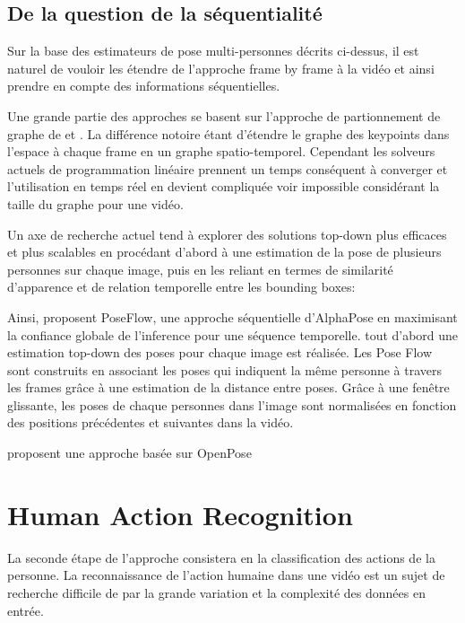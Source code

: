 \subsection{De la question de la séquentialité}
Sur la base des estimateurs de pose multi-personnes décrits ci-dessus, il est naturel de vouloir les étendre
de l'approche frame by frame à la vidéo et ainsi prendre en compte des informations séquentielles.

Une grande partie des approches se basent sur l'approche de partionnement de graphe de \cite{2015arXiv151106645P} et \cite{2016arXiv160503170I}. La différence notoire étant d'étendre le graphe des keypoints dans l'espace à chaque frame en un graphe spatio-temporel. Cependant les solveurs actuels de programmation linéaire prennent un temps conséquent à converger et l'utilisation en temps réel en devient compliquée voir impossible considérant la taille du graphe pour une vidéo.

Un axe de recherche actuel tend à explorer des solutions top-down plus efficaces et plus scalables en procédant d'abord à une estimation de la pose de plusieurs personnes sur chaque image, puis en les reliant
en termes de similarité d'apparence et de relation temporelle entre les bounding boxes:

Ainsi, \cite{2018arXiv180200977X} proposent PoseFlow, une approche séquentielle d'AlphaPose \cite{fang2017rmpe} en maximisant la confiance globale de l'inference pour une séquence temporelle. tout d'abord une estimation top-down des poses pour chaque image est réalisée. Les Pose Flow sont construits en associant les poses qui indiquent la même personne à travers les frames grâce à une estimation de la distance entre poses. Grâce à une fenêtre glissante, les poses de chaque personnes dans l'image sont normalisées en fonction des positions précédentes et suivantes dans la vidéo.

\cite{Raaj_2019_CVPR} proposent une approche basée sur OpenPose \cite{cao2017realtime}






\section{Human Action Recognition}
\label{subsec:HAR}

La seconde étape de l'approche consistera en la classification des actions de la personne. La reconnaissance de l'action humaine dans une vidéo est un sujet de recherche difficile de par la grande variation et la complexité des données en entrée.

